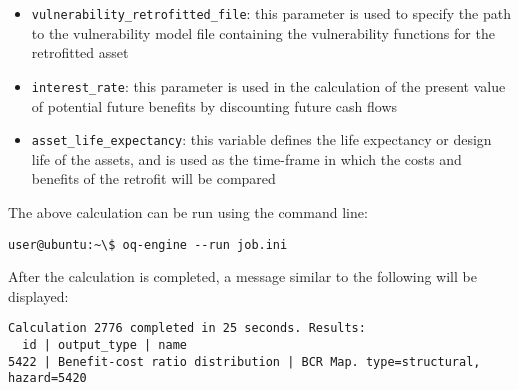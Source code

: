\begin{itemize}

  \item \Verb+vulnerability_retrofitted_file+: this parameter is used to
    specify the path to the \gls{vulnerability model} file containing the
    \glspl{vulnerability function} for the retrofitted asset

  \item \Verb+interest_rate+: this parameter is used in the calculation of the
    present value of potential future benefits by discounting future cash flows

  \item \Verb+asset_life_expectancy+: this variable defines the life
    expectancy or design life of the assets, and is used as the time-frame in
    which the costs and benefits of the retrofit will be compared

\end{itemize}

The above calculation can be run using the command line:

\begin{verbatim}
user@ubuntu:~\$ oq-engine --run job.ini
\end{verbatim}

After the calculation is completed, a message similar to the following will be
displayed:

\begin{verbatim}
Calculation 2776 completed in 25 seconds. Results:
  id | output_type | name
5422 | Benefit-cost ratio distribution | BCR Map. type=structural, hazard=5420
\end{verbatim}